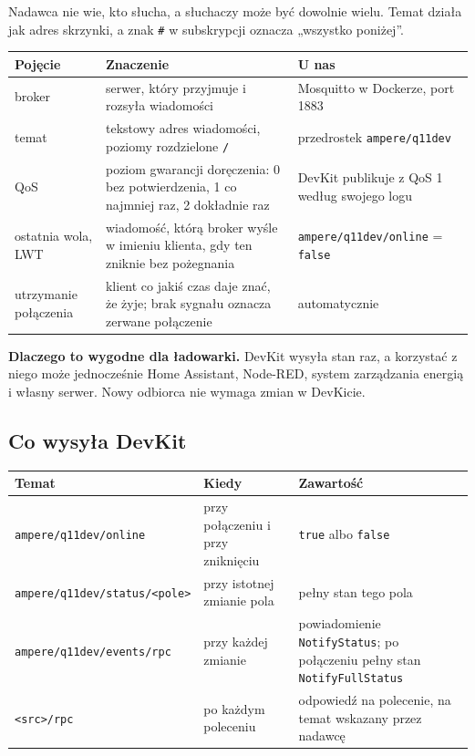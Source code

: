 \documentclass[11pt,a4paper]{article}
\begin{document}
Nadawca nie wie, kto słucha, a słuchaczy może być dowolnie wielu. Temat działa jak adres skrzynki, a znak \texttt{\#} w subskrypcji oznacza „wszystko poniżej”.


\begin{longtable}{>{\raggedright\arraybackslash}p{3.00cm}>{\raggedright\arraybackslash}p{8.53cm}>{\raggedright\arraybackslash}p{3.75cm}}
\toprule
\rowcolor{apteallight}\textbf{Pojęcie} & \textbf{Znaczenie} & \textbf{U nas} \\
\midrule\endhead
\bottomrule\endfoot
broker & serwer, który przyjmuje i rozsyła wiadomości & Mosquitto w Dockerze, port 1883 \\
temat & tekstowy adres wiadomości, poziomy rozdzielone \texttt{/} & przedrostek \texttt{ampere/\allowbreak{}q11dev} \\
QoS & poziom gwarancji doręczenia: 0 bez potwierdzenia, 1 co najmniej raz, 2 dokładnie raz & DevKit publikuje z QoS 1 według swojego logu \\
ostatnia wola, LWT & wiadomość, którą broker wyśle w imieniu klienta, gdy ten zniknie bez pożegnania & \texttt{ampere/\allowbreak{}q11dev/\allowbreak{}online} = \texttt{false} \\
utrzymanie połączenia & klient co jakiś czas daje znać, że żyje; brak sygnału oznacza zerwane połączenie & automatycznie \\
\end{longtable}

\textbf{Dlaczego to wygodne dla ładowarki.} DevKit wysyła stan raz, a korzystać z niego może jednocześnie Home Assistant, Node-RED, system zarządzania energią i własny serwer. Nowy odbiorca nie wymaga zmian w DevKicie.


\subsection{Co wysyła DevKit}

\begin{longtable}{>{\raggedright\arraybackslash}p{3.83cm}>{\raggedright\arraybackslash}p{4.20cm}>{\raggedright\arraybackslash}p{7.25cm}}
\toprule
\rowcolor{apteallight}\textbf{Temat} & \textbf{Kiedy} & \textbf{Zawartość} \\
\midrule\endhead
\bottomrule\endfoot
\texttt{ampere/\allowbreak{}q11dev/\allowbreak{}online} & przy połączeniu i przy zniknięciu & \texttt{true} albo \texttt{false} \\
\texttt{ampere/\allowbreak{}q11dev/\allowbreak{}status/\allowbreak{}<pole>} & przy istotnej zmianie pola & pełny stan tego pola \\
\texttt{ampere/\allowbreak{}q11dev/\allowbreak{}events/\allowbreak{}rpc} & przy każdej zmianie & powiadomienie \texttt{NotifyStatus}; po połączeniu pełny stan \texttt{NotifyFullStatus} \\
\texttt{<src>/rpc} & po każdym poleceniu & odpowiedź na polecenie, na temat wskazany przez nadawcę \\
\end{longtable}
\end{document}
